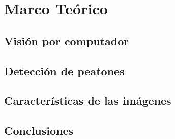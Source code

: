 
\chapter{Marco Te\'orico}
\label{cap:preliminares}


\section{Visión por computador}
\label{preliminares:vision}

\section{Detección de peatones}
\label{preliminares:deteccion}

\section{Características de las imágenes}
\label{preliminares:caract}

\section{Conclusiones}
\label{preliminares:conclusiones}




